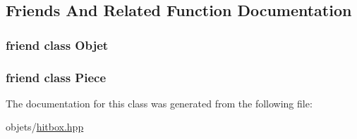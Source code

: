 \subsection{Friends And Related Function Documentation}
\hypertarget{class_hitbox_abf29628e823da6dc231602cb6a1c86d9}{
\subsubsection[{Objet}]{\setlength{\rightskip}{0pt plus 5cm}friend class {\bf Objet}\hspace{0.3cm}{\ttfamily [friend]}}}\label{class_hitbox_abf29628e823da6dc231602cb6a1c86d9}
\hypertarget{class_hitbox_ae6fa0350c8ef33e791f1f9a4daa5e3d1}{
\subsubsection[{Piece}]{\setlength{\rightskip}{0pt plus 5cm}friend class {\bf Piece}\hspace{0.3cm}{\ttfamily [friend]}}}\label{class_hitbox_ae6fa0350c8ef33e791f1f9a4daa5e3d1}


The documentation for this class was generated from the following file\+:\begin{DoxyCompactItemize}
\item 
objets/\hyperlink{hitbox_8hpp}{hitbox.\+hpp}\end{DoxyCompactItemize}
